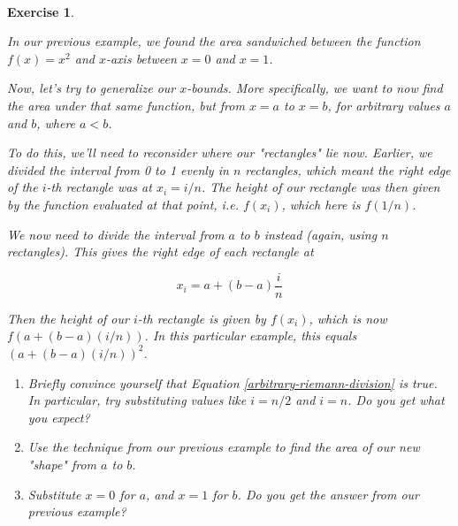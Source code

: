 \documentclass{book}
\newtheorem{exercise}{\\ \bf Exercise}
\begin{document}
\begin{exercise}
\label{riemann-general-bounds}

In our previous example, we found the area sandwiched between the function $f(x) = x^2$ and $x$-axis between $x = 0$ and $x = 1$.

Now, let's try to generalize our $x$-bounds. More specifically, we want to now find the area under that same function, but from $x = a$ to $x = b$, for arbitrary values $a$ and $b$, where $a < b$. 


To do this, we'll need to reconsider where our "rectangles" lie now. Earlier, we divided the interval from 0 to 1 evenly in $n$ rectangles, which meant the right edge of the $i$-th rectangle was at $x_i = i/n$. The height of our rectangle was then given by the function evaluated at that point, i.e. $f(x_i)$, which here is $f(1/n)$.

We now need to divide the interval from $a$ to $b$ instead (again, using $n$ rectangles). This gives the right edge of each rectangle at

\begin{equation}
\label{arbitrary-riemann-division}
x_i = a + (b-a)\frac{i}{n}
\end{equation}

Then the height of our $i$-th rectangle is given by $f(x_i)$, which is now $f(a + (b-a)(i/n))$. In this particular example, this equals $(a + (b-a)(i/n))^2$.

\begin{enumerate}
\item Briefly convince yourself that Equation \ref{arbitrary-riemann-division} is true. In particular, try substituting values like $i = n/2$ and $i = n$. Do you get what you expect?
\item Use the technique from our previous example to find the area of our new "shape" from $a$ to $b$. 
\item Substitute $x = 0$ for $a$, and $x = 1$ for $b$. Do you get the answer from our previous example?
\end{enumerate}

\end{exercise}






\end{document}
